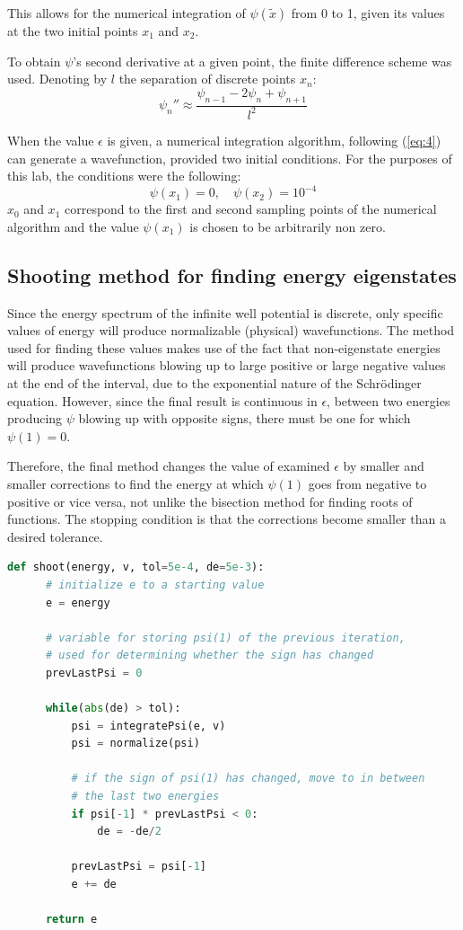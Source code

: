 \documentclass[11pt]{article}
\begin{document}
This allows for the numerical integration of $\psi(\tilde{x})$ from 0 to 1,
 given its values at the two
initial points $x_1$ and $x_2$.

To obtain $\psi$'s second derivative at a given point, the finite difference
scheme was used. Denoting by $l$ the separation of discrete points $x_n$:
\begin{equation}
  \psi_n''\approx\frac{\psi_{n-1}-2\psi_n+\psi_{n+1}}{l^2}
\end{equation}

When the value $\epsilon$ is given, a numerical integration algorithm, following
(\ref{eq:4}) can 
generate a wavefunction, provided two initial conditions.
For the purposes of this lab, the conditions were the following:
\begin{equation*}
  \psi(x_1)=0,\quad \psi(x_2)=10^{-4}
\end{equation*}
$x_0$ and $x_1$ correspond to the first and second sampling points of the
numerical algorithm and the value $\psi(x_1)$ is chosen to be arbitrarily non
zero.

\subsection{Shooting method for finding energy eigenstates}

Since the energy spectrum of the infinite well potential is discrete, only specific
values of energy will produce normalizable (physical) wavefunctions. 
The method used for finding these values makes use of the fact that non-eigenstate
energies will produce wavefunctions blowing up to large positive or large negative
values at the end of the interval, due to the exponential nature of the Schr{\"o}dinger
equation. However, since the final result is continuous in $\epsilon$, 
between two energies producing $\psi$ blowing
up with opposite signs, there must be one for which $\psi(1)=0$.

Therefore, the final method changes the value of examined $\epsilon$
by smaller and smaller corrections to find the energy at which $\psi(1)$ goes
from negative to positive or vice versa, not unlike the bisection method for
finding roots of functions. The stopping condition is that the corrections
become smaller than a desired tolerance.

\begin{lstlisting}[language=Python, style=myStyle]
  def shoot(energy, v, tol=5e-4, de=5e-3):
      # initialize e to a starting value
      e = energy

      # variable for storing psi(1) of the previous iteration,
      # used for determining whether the sign has changed
      prevLastPsi = 0
      
      while(abs(de) > tol):
          psi = integratePsi(e, v)
          psi = normalize(psi)
          
          # if the sign of psi(1) has changed, move to in between 
          # the last two energies
          if psi[-1] * prevLastPsi < 0:
              de = -de/2

          prevLastPsi = psi[-1]
          e += de

      return e
\end{lstlisting}
\end{document}

